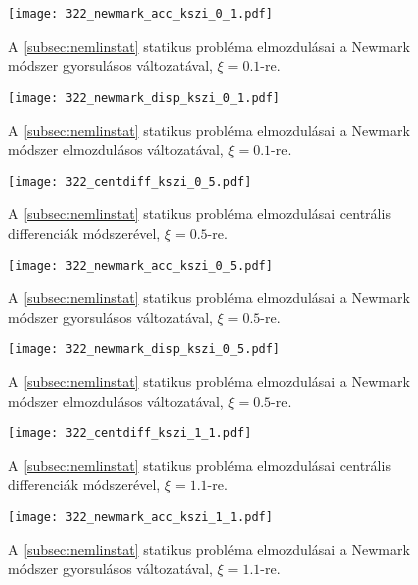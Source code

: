 \begin{figure}[H]
\centering
\texttt{[image: 322\_newmark\_acc\_kszi\_0\_1.pdf]}
\caption{A \ref{subsec:nemlinstat} statikus probléma elmozdulásai a Newmark módszer gyorsulásos változatával, $\xi = 0.1$-re.}
\label{fig:függ322_newmark_acc_0_1}
\end{figure}

\begin{figure}[H]
\centering
\texttt{[image: 322\_newmark\_disp\_kszi\_0\_1.pdf]}
\caption{A \ref{subsec:nemlinstat} statikus probléma elmozdulásai a Newmark módszer elmozdulásos változatával, $\xi = 0.1$-re.}
\label{fig:függ322_newmark_disp_0_1}
\end{figure}

\begin{figure}[H]
\centering
\texttt{[image: 322\_centdiff\_kszi\_0\_5.pdf]}
\caption{A \ref{subsec:nemlinstat} statikus probléma elmozdulásai centrális differenciák módszerével, $\xi = 0.5$-re.}
\label{fig:függ322_centdiff_0_5}
\end{figure}

\begin{figure}[H]
\centering
\texttt{[image: 322\_newmark\_acc\_kszi\_0\_5.pdf]}
\caption{A \ref{subsec:nemlinstat} statikus probléma elmozdulásai a Newmark módszer gyorsulásos változatával, $\xi = 0.5$-re.}
\label{fig:függ322_newmark_acc_0_5}
\end{figure}

\begin{figure}[H]
\centering
\texttt{[image: 322\_newmark\_disp\_kszi\_0\_5.pdf]}
\caption{A \ref{subsec:nemlinstat} statikus probléma elmozdulásai a Newmark módszer elmozdulásos változatával, $\xi = 0.5$-re.}
\label{fig:függ322_newmark_disp_0_5}
\end{figure}

\begin{figure}[H]
\centering
\texttt{[image: 322\_centdiff\_kszi\_1\_1.pdf]}
\caption{A \ref{subsec:nemlinstat} statikus probléma elmozdulásai centrális differenciák módszerével, $\xi = 1.1$-re.}
\label{fig:függ322_centdiff_1_1}
\end{figure}

\begin{figure}[H]
\centering
\texttt{[image: 322\_newmark\_acc\_kszi\_1\_1.pdf]}
\caption{A \ref{subsec:nemlinstat} statikus probléma elmozdulásai a Newmark módszer gyorsulásos változatával, $\xi = 1.1$-re.}
\label{fig:függ322_newmark_acc_1_1}
\end{figure}

